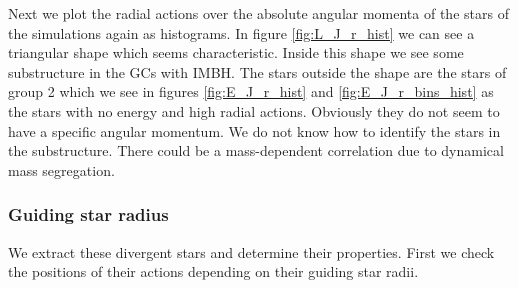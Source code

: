 \par Next we plot the radial actions over the absolute angular momenta of the stars of the simulations again as histograms. In figure \ref{fig:L_J_r_hist} we can see a triangular shape which seems characteristic. Inside this shape we see some substructure in the \acp{GC} with \ac{IMBH}. The stars outside the shape are the stars of group 2 which we see in figures \ref{fig:E_J_r_hist} and \ref{fig:E_J_r_bins_hist} as the stars with no energy and high radial actions. Obviously they do not seem to have a specific angular momentum. We do not know how to identify the stars in the substructure. There could be a mass-dependent correlation due to dynamical mass segregation.

\subsubsection{Guiding star radius}
\par We extract these divergent stars and determine their properties. First we check the positions of their actions depending on their guiding star radii.
